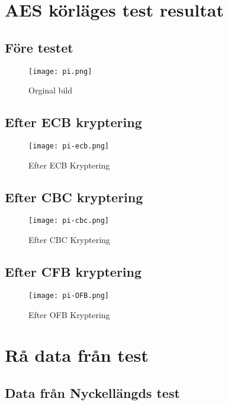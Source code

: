 \appendix

\chapter{AES körläges test resultat}

\section{Före testet}
\begin{figure}[H]
  \centering
  \texttt{[image: pi.png]}
  \caption{Orginal bild}
  \label{fig:pi-original}
\end{figure}

\section{Efter ECB kryptering}
\begin{figure}[H]
  \centering
  \texttt{[image: pi-ecb.png]}
  \caption{Efter ECB Kryptering}
  \label{fig:pi-ecb}
\end{figure}

\section{Efter CBC kryptering}
\begin{figure}[H]
  \centering
  \texttt{[image: pi-cbc.png]}
  \caption{Efter CBC Kryptering}
  \label{fig:pi-cbc}
\end{figure}

\section{Efter CFB kryptering}
\begin{figure}[H]
  \centering
  \texttt{[image: pi-OFB.png]}
  \caption{Efter OFB Kryptering}
  \label{fig:pi-ofb}
\end{figure}

\cleardoublepage

\chapter{Rå data från test}
\label{app:raw-data}

\section{Data från Nyckellängds test}
\label{app:raw-data-keylength}


